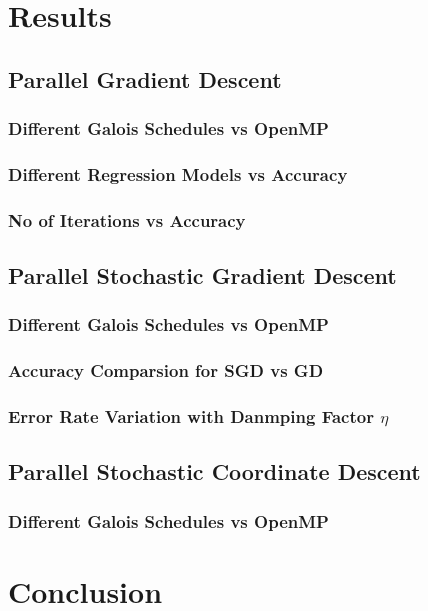 \documentclass{sigplanconf}
\begin{document}
\section{Results}
\subsection{Parallel Gradient Descent}
\subsubsection{Different Galois Schedules vs OpenMP}
\subsubsection{Different Regression Models vs Accuracy}
\subsubsection{No of Iterations vs Accuracy}
\subsection{Parallel Stochastic Gradient Descent}
\subsubsection{Different Galois Schedules vs OpenMP}
\subsubsection{Accuracy Comparsion for SGD vs GD}
\subsubsection{Error Rate Variation with Danmping Factor \(\eta\) }
\subsection{Parallel Stochastic Coordinate Descent}
\subsubsection{Different Galois Schedules vs OpenMP}

\section{Conclusion}


\end{document}
